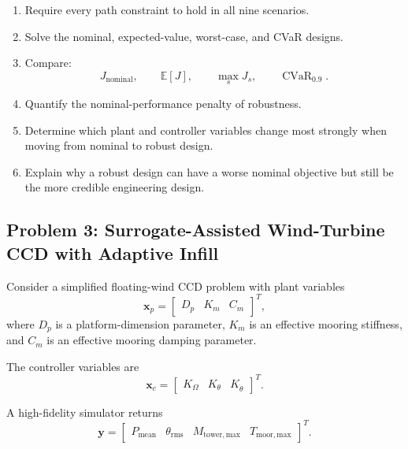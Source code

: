 \begin{enumerate}
    \item Require every path constraint to hold in all nine scenarios.

    \item Solve the nominal, expected-value, worst-case, and CVaR designs.

    \item Compare:
    \begin{equation}
    J_{\mathrm{nominal}},
    \qquad
    \mathbb{E}[J],
    \qquad
    \max_sJ_s,
    \qquad
    \operatorname{CVaR}_{0.9}.
    \end{equation}

    \item Quantify the nominal-performance penalty of robustness.

    \item Determine which plant and controller variables change most strongly
    when moving from nominal to robust design.

    \item Explain why a robust design can have a worse nominal objective but
    still be the more credible engineering design.
\end{enumerate}


\subsection*{Problem 3: Surrogate-Assisted Wind-Turbine CCD with Adaptive Infill}

Consider a simplified floating-wind CCD problem with plant variables
\begin{equation}
\mathbf{x}_p
=
\begin{bmatrix}
D_p&
K_m&
C_m
\end{bmatrix}^{T},
\end{equation}
where $D_p$ is a platform-dimension parameter, $K_m$ is an effective mooring
stiffness, and $C_m$ is an effective mooring damping parameter.

The controller variables are
\begin{equation}
\mathbf{x}_c
=
\begin{bmatrix}
K_{\Omega}&
K_{\theta}&
K_{\dot{\theta}}
\end{bmatrix}^{T}.
\end{equation}

A high-fidelity simulator returns
\begin{equation}
\mathbf{y}
=
\begin{bmatrix}
P_{\mathrm{mean}}&
\theta_{\mathrm{rms}}&
M_{\mathrm{tower,max}}&
T_{\mathrm{moor,max}}
\end{bmatrix}^{T}.
\end{equation}

